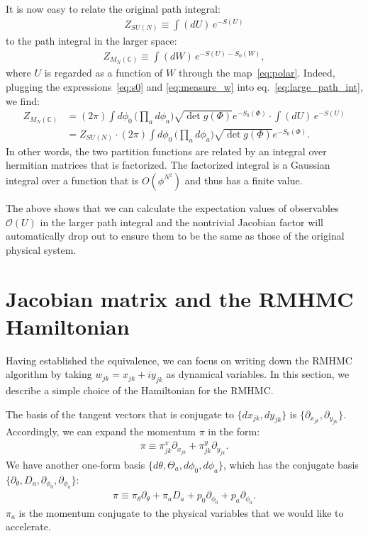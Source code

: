 \documentclass[12pt]{article}
\begin{document}
It is now easy to relate the original path integral:
\begin{align}
  Z_{SU(N)}
  \equiv
  \int(dU)\,
  e^{-S(U)}
\end{align}
to the path integral in the larger space:
\begin{align}
  Z_{M_N(\mathbb{C})}
  \equiv
  \int (dW)\,
  e^{ - S(U)- S_0(W)},
  \label{eq:large_path_int}
\end{align}
where $U$ is regarded as a function of $W$ through the map~\eqref{eq:polar}.
Indeed, plugging the expressions~\eqref{eq:s0} and \eqref{eq:measure_w}
into eq.~\eqref{eq:large_path_int}, we find:
\begin{align}
  Z_{M_N(\mathbb{C})}
  &=
    (2\pi)
    \int
    d\phi_0
    \,
    \Big(\prod_a d\phi_a\Big)
    \sqrt{\det g(\Phi)}
    e^{-S_0(\Phi)}
    \cdot
    \int
    (dU)\, e^{-S(U)} \nonumber \\
  &=
    Z_{SU(N)}
    \cdot
    (2\pi)
    \int
    d\phi_0
    \,
    \Big(\prod_a d\phi_a\Big)
    \sqrt{\det g(\Phi)}
    e^{-S_0(\Phi)}.
\end{align}
In other words,
the two partition functions are related by
an integral over hermitian matrices
that is factorized.
The factorized integral is a Gaussian integral
over a function that is $O(\phi^{N^2})$
and thus has a finite value.

The above shows that we can calculate the expectation values of
observables ${\mathcal O}(U)$ in the larger path integral
and the nontrivial Jacobian factor will automatically drop out
to ensure them to be the same as those of the original physical system.



\section{Jacobian matrix and the RMHMC Hamiltonian}
\label{sec:rmhmc_hamil}

Having established the equivalence,
we can focus on writing down the
RMHMC algorithm by taking
$w_{jk}=x_{jk}+iy_{jk}$ as dynamical variables.
In this section, we describe a simple
choice of the Hamiltonian for the RMHMC.

The basis of the tangent vectors
that is conjugate to $\{dx_{jk}, dy_{jk}\}$
is $\{\partial_{x_{jk}}, \partial_{y_{jk}} \}$.
Accordingly, we can expand the momentum $\pi$ in the form:
\begin{align}
  \pi
  \equiv
  \pi^x_{jk}\partial_{x_{jk}}
  +
  \pi^y_{jk}\partial_{y_{jk}}.
\end{align}
We have another one-form basis
$\{d\theta, \Theta_a, d\phi_0, d\phi_a\}$,
which has the conjugate basis
$\{\partial_\theta, D_a, \partial_{\phi_0}, \partial_{\phi_a} \}$:
\begin{align}
  \pi
  \equiv
  \pi_\theta \partial_{\theta}
  +
  \pi_a D_a
  +
  p_0 \partial_{\phi_0}
  +
  p_a \partial_{\phi_a}.
\end{align}
$\pi_a$ is the momentum conjugate to the physical variables
that we would like to accelerate.
\end{document}
